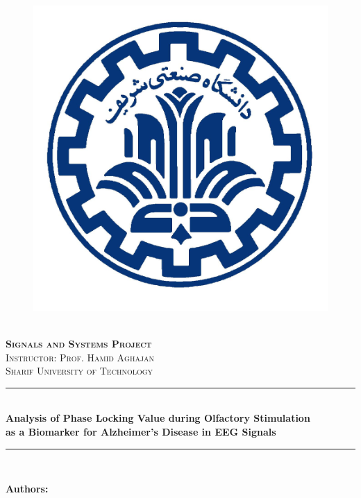 \documentclass[12pt]{article}
\newcommand{\HRule}{\rule{\linewidth}{0.5mm}} %
\begin{document}
\begin{center}
	\begin{figure}
		\vspace{-1.0cm}
		\centering
		\includegraphics[scale = 0.15]{Images/Sharif_University_Logo.jpg} %
	\end{figure}
	\mbox{}\\[1.5cm]
	\textsc{\Huge \textbf{Signals and Systems Project}}\\[1.0cm]
	\textsc{\LARGE Instructor: Prof. Hamid Aghajan}\\[1.5cm]
	\textsc{\LARGE Sharif University of Technology}\\[1.0cm]
	\HRule\\[0.4cm]
	{\large \bf {\selectfont Analysis of Phase Locking Value during Olfactory Stimulation \\ \medskip as a Biomarker for Alzheimer's Disease in EEG Signals} }\\[0.2cm]
	\HRule\\[1.5cm]
\end{center}

\begin{flushleft}
	\textbf{\selectfont Authors:}
\end{flushleft}
\end{document}
